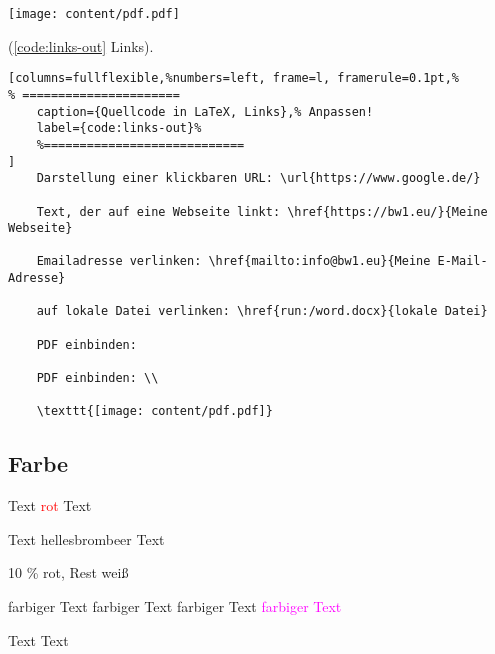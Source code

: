 \texttt{[image: content/pdf.pdf]}


(\autoref{code:links-out} Links).
\lstset{language=[LaTeX]TeX} %
\begin{lstlisting}[columns=fullflexible,%numbers=left, frame=l, framerule=0.1pt,%
% ======================
	caption={Quellcode in LaTeX, Links},% Anpassen!
	label={code:links-out}%
	%============================
]
	Darstellung einer klickbaren URL: \url{https://www.google.de/}

	Text, der auf eine Webseite linkt: \href{https://bw1.eu/}{Meine Webseite}

	Emailadresse verlinken: \href{mailto:info@bw1.eu}{Meine E-Mail-Adresse}

	auf lokale Datei verlinken: \href{run:/word.docx}{lokale Datei} 

	PDF einbinden: 

	PDF einbinden: \\
	
	\texttt{[image: content/pdf.pdf]}
\end{lstlisting}

\newpage

\subsection{Farbe}

Text \textcolor{red}{rot} Text

Text \colorbox{hellesbrombeer}{hellesbrombeer} Text

\colorbox{red!10!white}{10 \% rot, Rest weiß}

\textcolor{meinorange}{farbiger Text}
\textcolor{meinblue}{farbiger Text}
\textcolor{meinred}{farbiger Text}
\textcolor{magenta}{farbiger Text}


\colorbox{meingrey}{Text}
\colorbox{meinorange}{Text}


